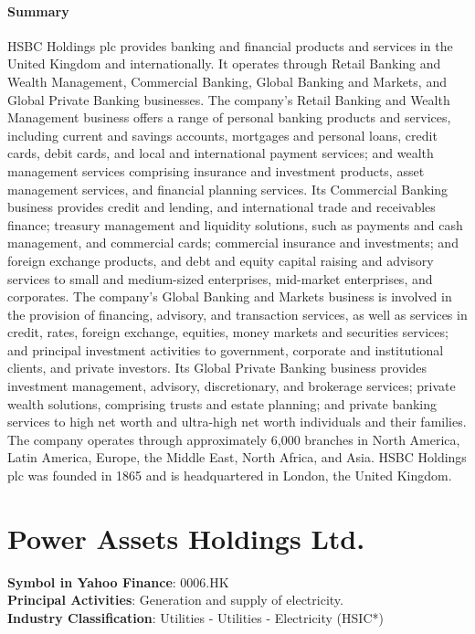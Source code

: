 \paragraph{Summary}
HSBC Holdings plc provides banking and financial products and services in the United Kingdom and internationally. It operates through Retail Banking and Wealth Management, Commercial Banking, Global Banking and Markets, and Global Private Banking businesses. The company's Retail Banking and Wealth Management business offers a range of personal banking products and services, including current and savings accounts, mortgages and personal loans, credit cards, debit cards, and local and international payment services; and wealth management services comprising insurance and investment products, asset management services, and financial planning services. Its Commercial Banking business provides credit and lending, and international trade and receivables finance; treasury management and liquidity solutions, such as payments and cash management, and commercial cards; commercial insurance and investments; and foreign exchange products, and debt and equity capital raising and advisory services to small and medium-sized enterprises, mid-market enterprises, and corporates. The company's Global Banking and Markets business is involved in the provision of financing, advisory, and transaction services, as well as services in credit, rates, foreign exchange, equities, money markets and securities services; and principal investment activities to government, corporate and institutional clients, and private investors. Its Global Private Banking business provides investment management, advisory, discretionary, and brokerage services; private wealth solutions, comprising trusts and estate planning; and private banking services to high net worth and ultra-high net worth individuals and their families. The company operates through approximately 6,000 branches in North America, Latin America, Europe, the Middle East, North Africa, and Asia. HSBC Holdings plc was founded in 1865 and is headquartered in London, the United Kingdom.


\section{Power Assets Holdings Ltd.}
\textbf{Symbol in Yahoo Finance}: 0006.HK\\
\textbf{Principal Activities}: Generation and supply of electricity.\\
\textbf{Industry Classification}: Utilities - Utilities - Electricity (HSIC*)
